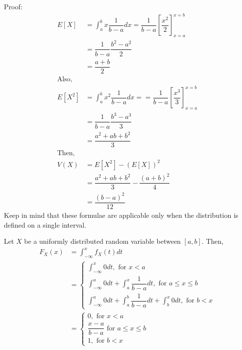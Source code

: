 Proof:
\begin{equation*}
    \begin{split}
        E[X] &= \int_{a}^{b} x \dfrac{1}{b-a}dx = \dfrac{1}{b-a} \left[ \dfrac{x^2}{2}\right]_{x = a}^{x = b} \\
        &= \dfrac{1}{b-a}\dfrac{b^2 - a^2}{2} \\
        &= \dfrac{a + b}{2} \\
        \text{Also, } \\
        E[X^2] &= \int_{a}^{b} x^2 \dfrac{1}{b-a}dx = = \dfrac{1}{b-a} \left[ \dfrac{x^3}{3}\right]_{x = a}^{x = b} \\
        &= \dfrac{1}{b-a}\dfrac{b^3 - a^3}{3} \\
        &= \dfrac{a^2 + ab + b^2}{3} \\
        \text{Then, } \\
        V(X) &= E[X^2] - (E[X])^2 \\
        &= \dfrac{a^2 + ab + b^2}{3} - \dfrac{(a + b)^2}{4} \\
        &= \dfrac{(b-a)^2}{12}
    \end{split}
\end{equation*}
Keep in mind that these formulae are applicable only when the distribution is defined on a single interval.
\begin{note}
\end{note}
Let $X$ be a uniformly distributed random variable between $[a,b]$. Then,
\begin{equation*}
    \begin{split}
        F_X(x) &= \int_{-\infty}^{x} f_X(t)dt \\
        &= \begin{cases}
        \int_{-\infty}^{x} 0 dt, \text{ for } x < a \\
        \int_{-\infty}^{a} 0 dt +  \int_{a}^{x} \dfrac{1}{b-a} dt, \text{ for } a \leq x \leq b \\
        \int_{-\infty}^{a} 0 dt + \int_{a}^{b} \dfrac{1}{b-a} dt + \int_{b}^{x} 0 dt, \text{ for } b < x
        \end{cases} \\
        &= 
        \begin{cases}
        0, \text{ for } x < a \\
        \dfrac{x-a}{b-a} \text{ for } a \leq x \leq b \\
        1, \text{ for } b < x
        \end{cases}
    \end{split}
\end{equation*}

